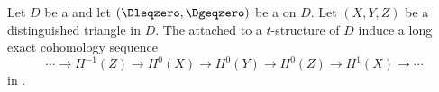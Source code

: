\begin{theorem} \label{theorem:long_exact_cohomological_sequence_in_core_for_t_structure_on_triangulated_categories_from_distinguished_triangle}
    Let $D$ be a  and let $(\Dleqzero, \Dgeqzero)$ be a  on $D$. Let $(X,Y,Z)$ be a distinguished triangle in $D$. 
    The  attached to a $t$-structure of $D$ induce a long exact cohomology sequence 
    $$\cdots \to H^{-1}(Z) \to H^0(X) \to H^0(Y) \to H^0(Z) \to H^1(X) \to \cdots$$
    in .
\end{theorem}